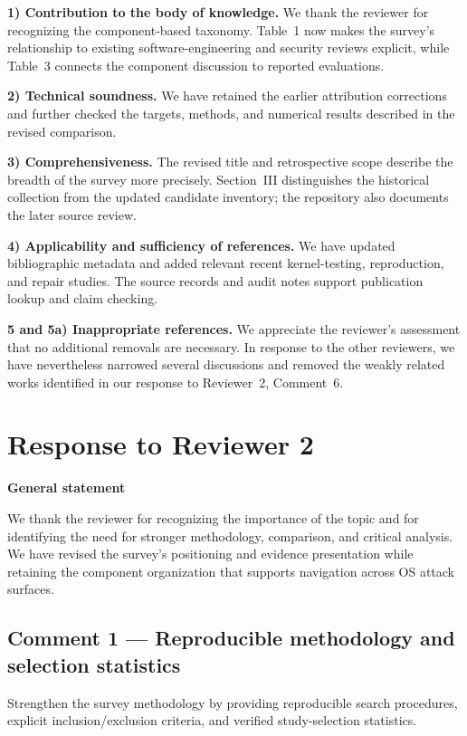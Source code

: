 \documentclass[11pt,a4paper]{article}
\begin{document}
\textbf{1) Contribution to the body of knowledge.} We thank the reviewer for recognizing the component-based taxonomy. Table~1 now makes the survey's relationship to existing software-engineering and security reviews explicit, while Table~3 connects the component discussion to reported evaluations.

\textbf{2) Technical soundness.} We have retained the earlier attribution corrections and further checked the targets, methods, and numerical results described in the revised comparison.

\textbf{3) Comprehensiveness.} The revised title and retrospective scope describe the breadth of the survey more precisely. Section~III distinguishes the historical collection from the updated candidate inventory; the repository also documents the later source review.

\textbf{4) Applicability and sufficiency of references.} We have updated bibliographic metadata and added relevant recent kernel-testing, reproduction, and repair studies. The source records and audit notes support publication lookup and claim checking.

\textbf{5 and 5a) Inappropriate references.} We appreciate the reviewer's assessment that no additional removals are necessary. In response to the other reviewers, we have nevertheless narrowed several discussions and removed the weakly related works identified in our response to Reviewer~2, Comment~6.

\section{Response to Reviewer 2}

\textbf{General statement}

We thank the reviewer for recognizing the importance of the topic and for identifying the need for stronger methodology, comparison, and critical analysis. We have revised the survey's positioning and evidence presentation while retaining the component organization that supports navigation across OS attack surfaces.

\subsection{Comment 1 --- Reproducible methodology and selection statistics}
\begin{reviewcomment}
Strengthen the survey methodology by providing reproducible search procedures, explicit inclusion/exclusion criteria, and verified study-selection statistics.
\end{reviewcomment}
\end{document}

